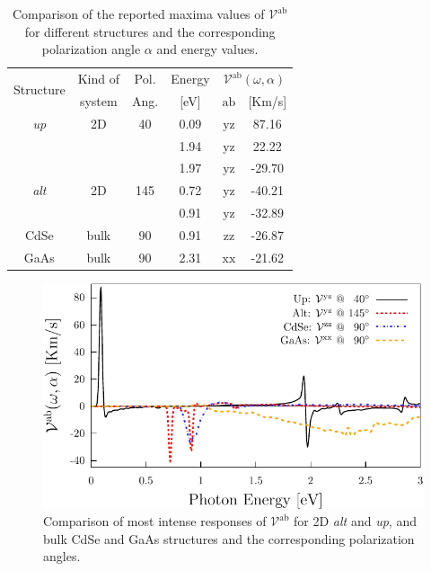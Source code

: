 \documentclass[prb,11pt,tightenlines,twocolumn,aps]{revtex4-1}
\begin{document}
\begin{table}[b]
\begin{tabular}{cccccc}
\hline
\multirow{2}{*}{Structure \quad} & 
Kind of \quad & 
Pol. &
Energy & 
\multicolumn{2}{c}{$\mathcal{V}^{\mathrm{ab}}(\omega,\alpha)$}\\
\cline{5-6}
& system & Ang. & [eV] & $\mathrm{ab}$ \quad & [Km/s]\\
\hline
\emph{up}    & 2D   & 40    & 0.09  & $\mathrm{yz}$ &  87.16    \\
             &      &       & 1.94  & $\mathrm{yz}$ &  22.22    \\
             &      &       & 1.97  & $\mathrm{yz}$ & -29.70    \\
\emph{alt}   & 2D   & 145   & 0.72  & $\mathrm{yz}$ & -40.21    \\
             &      &       & 0.91  & $\mathrm{yz}$ & -32.89    \\
 CdSe        & bulk & 90    & 0.91  & $\mathrm{zz}$ & -26.87    \\
 GaAs        & bulk & 90    & 2.31  & $\mathrm{xx}$ & -21.62    \\
\hline
\end{tabular}

\caption{Comparison of the reported maxima values of
$\mathcal{V}^{\mathrm{ab}}$ for different structures and the corresponding
polarization angle $\alpha$ and energy values.}
\label{tab:vab-str-comp}
\end{table}

\begin{figure}[t]
    \centering
    \includegraphics[width=\linewidth]{plots/vab-str-comp}
    
    \caption{Comparison of most intense responses of $\mathcal{V}^{\mathrm{ab}}$
    for 2D \emph{alt} and \emph{up}, and bulk CdSe and GaAs structures and the
    corresponding polarization angles.}
    \label{fig:vab-str-comp}
\end{figure}
\end{document}
